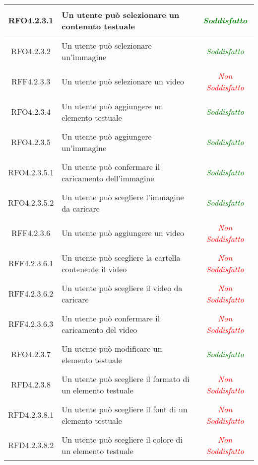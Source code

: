\begin{longtable}{|c|>{\centering}m{7cm}|c|}
\hypertarget{RFO4.2.3.1}{RFO4.2.3.1} & Un utente può selezionare un contenuto testuale & \textcolor{Green}{\textit{Soddisfatto}}\\ \hline
\hypertarget{RFO4.2.3.2}{RFO4.2.3.2} & Un utente può selezionare un'immagine & \textcolor{Green}{\textit{Soddisfatto}}\\ \hline
\hypertarget{RFF4.2.3.3}{RFF4.2.3.3} & Un utente può selezionare un video & \textcolor{Red}{\textit{Non Soddisfatto}}\\ \hline
\hypertarget{RFO4.2.3.4}{RFO4.2.3.4} & Un utente può aggiungere un elemento testuale & \textcolor{Green}{\textit{Soddisfatto}}\\ \hline
\hypertarget{RFO4.2.3.5}{RFO4.2.3.5} & Un utente può aggiungere un’immagine & \textcolor{Green}{\textit{Soddisfatto}}\\ \hline
\hypertarget{RFO4.2.3.5.1}{RFO4.2.3.5.1} & Un utente può confermare il caricamento dell'immagine & \textcolor{Green}{\textit{Soddisfatto}}\\ \hline
\hypertarget{RFO4.2.3.5.2}{RFO4.2.3.5.2} & Un utente può scegliere l'immagine da caricare & \textcolor{Green}{\textit{Soddisfatto}}\\ \hline
\hypertarget{RFF4.2.3.6}{RFF4.2.3.6} & Un utente può aggiungere un video & \textcolor{Red}{\textit{Non Soddisfatto}}\\ \hline
\hypertarget{RFF4.2.3.6.1}{RFF4.2.3.6.1} & Un utente può scegliere la cartella contenente il video & \textcolor{Red}{\textit{Non Soddisfatto}}\\ \hline
\hypertarget{RFF4.2.3.6.2}{RFF4.2.3.6.2} & Un utente può scegliere il video da caricare & \textcolor{Red}{\textit{Non Soddisfatto}}\\ \hline
\hypertarget{RFF4.2.3.6.3}{RFF4.2.3.6.3} & Un utente può confermare il caricamento del video & \textcolor{Red}{\textit{Non Soddisfatto}}\\ \hline
\hypertarget{RFO4.2.3.7}{RFO4.2.3.7} & Un utente può modificare un elemento testuale & \textcolor{Green}{\textit{Soddisfatto}}\\ \hline
\hypertarget{RFD4.2.3.8}{RFD4.2.3.8} & Un utente può scegliere il formato di un elemento testuale & \textcolor{Red}{\textit{Non Soddisfatto}}\\ \hline
\hypertarget{RFD4.2.3.8.1}{RFD4.2.3.8.1} & Un utente può scegliere il font di un elemento testuale & \textcolor{Red}{\textit{Non Soddisfatto}}\\ \hline
\hypertarget{RFD4.2.3.8.2}{RFD4.2.3.8.2} & Un utente può scegliere il colore di un elemento testuale & \textcolor{Red}{\textit{Non Soddisfatto}}\\ \hline

\end{longtable}
